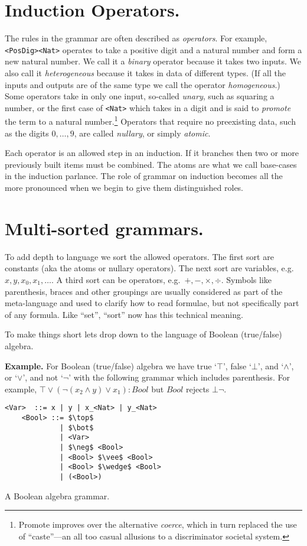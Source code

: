 
\section{Induction Operators.}
The rules in the grammar are often described as \emph{operators}.  For example,
\lstinline{<PosDig><Nat>} operates to take a positive digit and a natural number 
and form a new natural number.  We call it a \emph{binary} operator because it 
takes two inputs.  We also call it \emph{heterogeneous} because it takes in data 
of different types.  (If all the inputs and outputs are of the same type we call the operator 
\emph{homogeneous}.)  Some operators take in only one input, so-called \emph{unary},
such as squaring a number, or the first case of \lstinline{<Nat>} which takes in a digit and is said to \emph{promote} the 
term to a natural number.\footnote{Promote improves over the alternative \emph{coerce},
which in turn replaced the use of ``caste''---an all too casual allusions to a discriminator societal 
system.}
Operators that require no preexisting data, such 
as the digits $0,\ldots,9$, are called \emph{nullary}, or simply \emph{atomic}.

Each operator is an allowed step in an induction.  If it branches then two or more 
previously built items must be combined.  The atoms are what we call base-cases 
in the induction parlance.  The role of grammar on induction becomes all the more 
pronounced when we begin to give them distinguished roles.


\section*{Multi-sorted grammars.} To add depth to language we sort the allowed operators.  
The first sort are constants (aka the atoms or nullary operators).  The next sort are variables, e.g.\
$x,y,x_0,x_1,\ldots$. A third sort can be operators, e.g.\ $+,-,\times,\div$.
Symbols like parenthesis, braces and other groupings are usually considered as part of 
the meta-language and used to clarify how to read formulae, but not specifically part of any formula.
Like ``set'', ``sort'' now has this technical meaning.

To make things short lets drop down to the language of Boolean (true/false) algebra.
\medskip

\noindent\textbf{Example.}
For Boolean (true/false) algebra we have true `$\top$', false `$\bot$', 
and `$\wedge$', or `$\vee$', and not `$\neg$' with the following grammar
which includes parenthesis. For example, $\top \vee (\neg(x_2\wedge y)\vee x_1):Bool$ but $Bool$ rejects $\bot\neg$.
\begin{lstfloat}[!hbtp]
\begin{lstlisting}[mathescape]
    <Var>  ::= x | y | x_<Nat> | y_<Nat>
    <Bool> ::= $\top$ 
             | $\bot$ 
             | <Var>
             | $\neg$ <Bool> 
             | <Bool> $\vee$ <Bool> 
             | <Bool> $\wedge$ <Bool>
             | (<Bool>)
\end{lstlisting}
\caption{A Boolean algebra grammar.}
\end{lstfloat}

